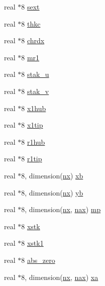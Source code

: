 \begin{DoxyCompactItemize}
real $\ast$8 \hyperlink{namespaceglobvar_a8773a7a4d47bf7edb84938ff38c3e302}{sext}
\item 
real $\ast$8 \hyperlink{namespaceglobvar_a23dd44d4f0c8b5be47685d9c5ee98041}{thkc}
\item 
real $\ast$8 \hyperlink{namespaceglobvar_a64b336f7ef2076d0b30fb86f6fe0ba1c}{chrdx}
\item 
real $\ast$8 \hyperlink{namespaceglobvar_aef87425714082b77e0f5f6fce2787666}{mr1}
\item 
real $\ast$8 \hyperlink{namespaceglobvar_a4f016b27bfa551903a9ff434167e63bb}{stak\+\_\+u}
\item 
real $\ast$8 \hyperlink{namespaceglobvar_af534fe32dd8a023b0311416cbffea2f7}{stak\+\_\+v}
\item 
real $\ast$8 \hyperlink{namespaceglobvar_a97e3fd0f031b96c6a64f2b048bd344f6}{x1hub}
\item 
real $\ast$8 \hyperlink{namespaceglobvar_ae73d73414e05c7ff4485109025aebb8b}{x1tip}
\item 
real $\ast$8 \hyperlink{namespaceglobvar_a23bf2eee6718016ef422ea6f1a96774a}{r1hub}
\item 
real $\ast$8 \hyperlink{namespaceglobvar_a925bcdc500de307bc4848f7ddc9a2574}{r1tip}
\item 
real $\ast$8, dimension(\hyperlink{namespaceglobvar_ae4d2e4d1bd4180999afe29337165e1e6}{nx}) \hyperlink{namespaceglobvar_af4daba9dc0eb452ca6d91e10550fa072}{xb}
\item 
real $\ast$8, dimension(\hyperlink{namespaceglobvar_ae4d2e4d1bd4180999afe29337165e1e6}{nx}) \hyperlink{namespaceglobvar_a77b51c294ee3b20cb6e14dcbf4cb6b3d}{yb}
\item 
real $\ast$8, dimension(\hyperlink{namespaceglobvar_ae4d2e4d1bd4180999afe29337165e1e6}{nx}, \hyperlink{namespaceglobvar_acff3033374e6d73d14fb06fc53fc205c}{nax}) \hyperlink{namespaceglobvar_a4616d2799c88911e5e46e57902cfa3a2}{mp}
\item 
real $\ast$8 \hyperlink{namespaceglobvar_a578ffe411cb075eda2ae3cf7781d1cb0}{xstk}
\item 
real $\ast$8 \hyperlink{namespaceglobvar_a6b041a8fbed932e28a5d0426dc9dc20a}{xstk1}
\item 
real $\ast$8 \hyperlink{namespaceglobvar_a2ffa8ff8b7b664c43c8c171090806037}{abs\+\_\+zero}
\item 
real $\ast$8, dimension(\hyperlink{namespaceglobvar_ae4d2e4d1bd4180999afe29337165e1e6}{nx}, \hyperlink{namespaceglobvar_acff3033374e6d73d14fb06fc53fc205c}{nax}) \hyperlink{namespaceglobvar_a8fc7e5c4a3ef5051faf2730bf96a2dd1}{xa}

\end{DoxyCompactItemize}
